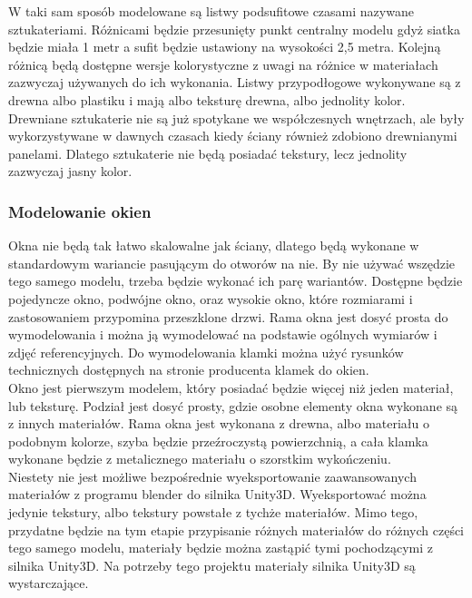 \documentclass{article} %
\begin{document}
            W taki sam sposób modelowane są listwy podsufitowe czasami nazywane sztukateriami. Różnicami będzie przesunięty punkt centralny modelu gdyż siatka będzie miała 1 metr a sufit będzie ustawiony na wysokości 2,5 metra. Kolejną różnicą będą dostępne wersje kolorystyczne z uwagi na różnice w materiałach zazwyczaj używanych do ich wykonania. Listwy przypodłogowe wykonywane są z drewna albo plastiku i mają albo teksturę drewna, albo jednolity kolor. Drewniane sztukaterie nie są już spotykane we współczesnych wnętrzach, ale były wykorzystywane w dawnych czasach kiedy ściany również zdobiono drewnianymi panelami. Dlatego sztukaterie nie będą posiadać tekstury, lecz jednolity zazwyczaj jasny kolor.
            \\
            
            
        \subsubsection{Modelowanie okien}
            Okna nie będą tak łatwo skalowalne jak ściany, dlatego będą wykonane w standardowym wariancie pasującym do otworów na nie. By nie używać wszędzie tego samego modelu, trzeba będzie wykonać ich parę wariantów. Dostępne będzie pojedyncze okno, podwójne okno, oraz wysokie okno, które rozmiarami i zastosowaniem przypomina przeszklone drzwi. Rama okna jest dosyć prosta do wymodelowania i można ją wymodelować na podstawie ogólnych wymiarów i zdjęć referencyjnych. Do wymodelowania klamki można użyć rysunków technicznych dostępnych na stronie producenta klamek do okien.
            \\
            
            Okno jest pierwszym modelem, który posiadać będzie więcej niż jeden materiał, lub teksturę. Podział jest dosyć prosty, gdzie osobne elementy okna wykonane są z innych materiałów. Rama okna jest wykonana z drewna, albo materiału o podobnym kolorze, szyba będzie przeźroczystą powierzchnią, a cała klamka wykonane będzie z metalicznego materiału o szorstkim wykończeniu. 
            \\
            
            Niestety nie jest możliwe bezpośrednie wyeksportowanie zaawansowanych materiałów z programu blender do silnika Unity3D. Wyeksportować można jedynie tekstury, albo tekstury powstałe z tychże materiałów. Mimo tego, przydatne będzie na tym etapie przypisanie różnych materiałów do różnych części tego samego modelu, materiały będzie można zastąpić tymi pochodzącymi z silnika Unity3D. Na potrzeby tego projektu materiały silnika Unity3D są wystarczające.
            \\
            
\end{document}
